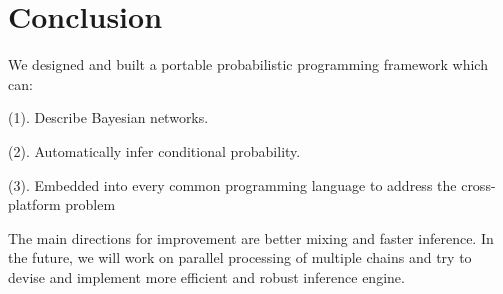\chapter{Conclusion}
\label{chap:conclusion}
We designed and built a portable probabilistic programming framework which can:

(1). Describe Bayesian networks. 

(2). Automatically infer conditional probability.

(3). Embedded into every common programming language to address the cross-platform problem

The main directions for improvement are better mixing and faster inference. In the future, we will work on parallel processing of multiple chains and try to devise and implement more efficient and robust inference engine.
